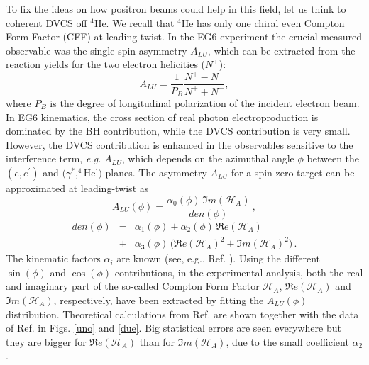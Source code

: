 \documentclass[times, twoside]{PosWhiPap}
\begin{document}
To fix the ideas on how positron beams could help in this field, 
let us think to coherent DVCS off $^4$He.
We recall that $^4$He has only one chiral even Compton Form Factor (CFF) at 
   leading twist. In the EG6 experiment the crucial measured
observable was the single-spin asymmetry
$A_{LU}$, which can be extracted from the reaction yields for the two electron
helicities ($N^{\pm}$):
\begin{equation}
A_{LU} = \frac{1}{P_{B}} \frac{N^{+} - N^{-}}{N^{+} + N^{-} },
\end{equation}
where $P_{B}$ is the degree of longitudinal polarization of the incident 
electron beam.
 In EG6 kinematics, the cross section of real photon electroproduction is 
   dominated by the BH contribution, while the DVCS contribution is very small.  
   However, the DVCS contribution is enhanced in the observables sensitive to 
   the interference term, {\it e.g.} $A_{LU}$, which depends on the
azimuthal angle $\phi$ between the $(e,e^\prime)$ and 
   $(\gamma^*,^4$He$^\prime)$ planes. The asymmetry $A_{LU}$ for a spin-zero 
   target can be approximated at leading-twist as
\begin{equation}
A_{LU}(\phi) = 
\frac{\alpha_{0}(\phi) \, \Im m(\mathcal{H}_{A})} 
{den(\phi)} \, ,
\end{equation}
\begin{eqnarray}
den(\phi) & = & 
\alpha_{1}(\phi) + \alpha_{2}(\phi) \, \Re e(\mathcal{H}_{A}) 
\nonumber
\\
& + & \alpha_{3}(\phi) \, 
\big( \Re e(\mathcal{H}_{A})^{2} + \Im m(\mathcal{H}_{A})^{2} \big)\, .
\label{boh}
\end{eqnarray}
The kinematic factors $\alpha_i$ are known (see, e.g., Ref.  
\cite{Belitsky:2001ns,Belitsky:2008bz}). Using the different $\sin(\phi)$ and 
$\cos(\phi)$ contributions, in the experimental analysis, both the real and 
imaginary part of the so-called Compton Form Factor $\mathcal{H}_{A}$,
$\Re e(\mathcal{H}_{A})$ and $\Im m(\mathcal{H}_{A})$, respectively,
have been extracted by fitting the $A_{LU}(\phi)$ distribution. Theoretical 
calculations from Ref. \cite{Fucini:2018gso} are shown together with the data 
of Ref. \cite{Hattawy:2017woc} in Figs. \ref{uno} and \ref{due}.
Big statistical errors are seen everywhere but they are bigger for $\Re 
e(\mathcal{H}_{A})$ than for $\Im m(\mathcal{H}_{A})$, due to the small 
coefficient $\alpha_2$.
\end{document}
